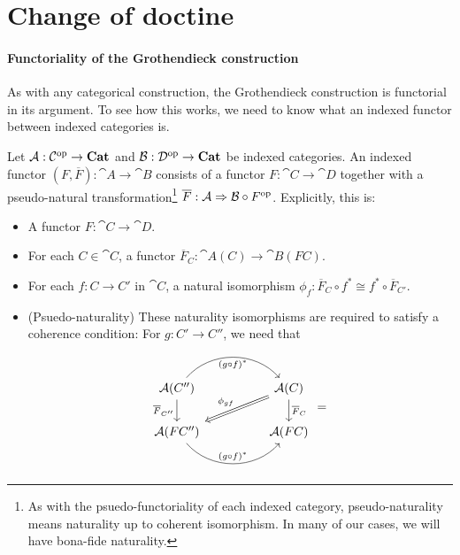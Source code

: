 \documentclass[DynamicalBook]{subfiles}
\begin{document}
\section{Change of doctine}


\paragraph{Functoriality of the Grothendieck construction}
As with any categorical construction, the Grothendieck construction is
functorial in its argument. To see how this works, we need to know what an
indexed functor between indexed categories is. 

\begin{definition}
  Let $\mathcal{A} : \mathcal{C}^{\textnormal{op}} \to \textbf{Cat}$ and $\mathcal{B} : \mathcal{D}^{\textnormal{op}} \to
  \textbf{Cat}$ be indexed categories. An indexed functor $(F, \overline{F}) :
  \cat{A} \to \cat{B}$ consists of a functor $F : \cat{C} \to \cat{D}$ together
  with a pseudo-natural transformation\footnote{As with the psuedo-functoriality
  of each indexed category, pseudo-naturality means naturality up to coherent
  isomorphism. In many of our cases, we will have bona-fide naturality.} $\overline{F} : \mathcal{A} \Rightarrow
  \mathcal{B} \circ F^{\textnormal{op}}$. Explicitly, this is:
  \begin{itemize}
  \item A functor $F : \cat{C} \to \cat{D}$.
  \item For each $C \in \cat{C}$, a functor $\overline{F}_C : \cat{A}(C) \to \cat{B}(FC)$.
  \item For each $f : C \to C'$ in $\cat{C}$, a natural isomorphism $\phi_f :
    \overline{F}_{C} \circ f^{\ast} \cong f^{\ast} \circ \overline{F}_{C'}$.
  \item (Psuedo-naturality) These naturality isomorphisms are required to satisfy a coherence condition: For $g : C' \to C''$,
    we need that
    \[
\begin{tikzcd}
\cat{A}(C'') \arrow[d, "\overline{F}_{C''}"']  \arrow[rr, "(g
\circ f)^\ast"{name=Top, below}, bend left=49]  &  & \cat{A}(C) \arrow[d,
"\overline{F}_C"] \arrow[lld, "\phi_{gf}"', Rightarrow] \\
\cat{A}(FC'')  \arrow[rr, "(g \circ
f)^{\ast}"'{name=Bottom, above}, bend right=49]                          &
                                                                          & \cat{A}(FC)                                                             
\end{tikzcd}
=
\begin{tikzcd}

\end{tikzcd}\]
\end{itemize}
\end{definition}
\end{document}
